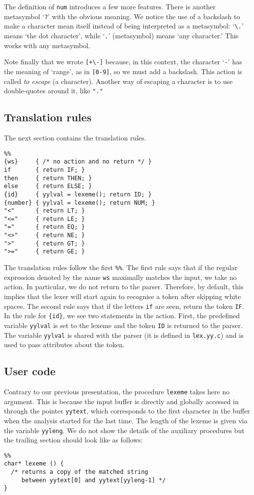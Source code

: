 The definition of \texttt{num} introduces a few more features. There
is another metasymbol `\verb+?+' with the obvious meaning. We notice
the use of a backslash to make a character mean itself instead of
being interpreted as a metasymbol: `\verb+\.+' means `the dot
character', while `\verb+.+' (metasymbol) means `any character.' This
works with any metasymbol.

Note finally that we wrote \verb|[+\-]| because, in this context, the
character `\verb|-|' has the meaning of `range', as in \verb+[0-9]+,
so we must add a backslash. This action is called \emph{to escape} (a
character). Another way of escaping a character is to use
double-quotes around it, like \verb+"."+

\subsection*{Translation rules}

The next section contains the translation rules. 
\begin{verbatim}
%%
{ws}     { /* no action and no return */ }
if       { return IF; }
then     { return THEN; }
else     { return ELSE; }
{id}     { yylval = lexeme(); return ID; }
{number} { yylval = lexeme(); return NUM; }
"<"      { return LT; }
"<="     { return LE; }
"="      { return EQ; }
"<>"     { return NE; }
">"      { return GT; }
">="     { return GE; }
\end{verbatim}
The translation rules follow the first \verb+%%+. The first rule says
that if the regular expression denoted by the name \texttt{ws}
maximally matches the input, we take no action. In particular, we do
not return to the parser. Therefore, by default, this implies that the
lexer will start again to recognise a token after skipping white
spaces. The second rule says that if the letters \texttt{if} are seen,
return the token \texttt{IF}. In the rule for \verb+{id}+, we see two
statements in the action. First, the \Lex predefined variable
\texttt{yylval} is set to the lexeme and the token \texttt{ID} is
returned to the parser. The variable \texttt{yylval} is shared with
the parser (it is defined in \texttt{lex.yy.c}) and is used to pass
attributes about the token.

\subsection*{User code}
 
Contrary to our previous presentation, the procedure \texttt{lexeme}
takes here no argument. This is because the input buffer is directly
and globally accessed in \Lex through the pointer \texttt{yytext},
which corresponds to the first character in the buffer when the
analysis started for the last time. The length of the lexeme is given
via the variable \texttt{yyleng}. We do not show the details of the
auxiliary procedures but the trailing section should look like as
follows:
\begin{verbatim}
%%
char* lexeme () {
  /* returns a copy of the matched string
     between yytext[0] and yytext[yyleng-1] */
}
\end{verbatim}

